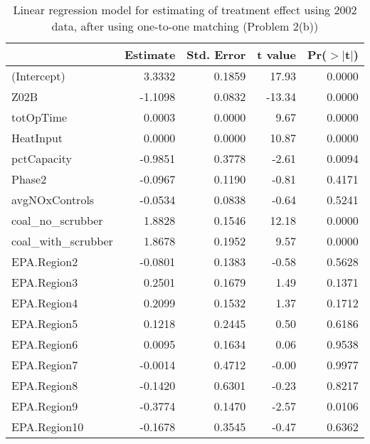 


\begin{table}[ht]
\centering
\begin{tabular}{lrrrr}
  \toprule
 & Estimate & Std. Error & t value & Pr($>$$|$t$|$) \\ 
  \midrule
(Intercept) & 3.3332 & 0.1859 & 17.93 & 0.0000 \\ 
  Z02B & -1.1098 & 0.0832 & -13.34 & 0.0000 \\ 
  totOpTime & 0.0003 & 0.0000 & 9.67 & 0.0000 \\ 
  HeatInput & 0.0000 & 0.0000 & 10.87 & 0.0000 \\ 
  pctCapacity & -0.9851 & 0.3778 & -2.61 & 0.0094 \\ 
  Phase2 & -0.0967 & 0.1190 & -0.81 & 0.4171 \\ 
  avgNOxControls & -0.0534 & 0.0838 & -0.64 & 0.5241 \\ 
  coal\_no\_scrubber & 1.8828 & 0.1546 & 12.18 & 0.0000 \\ 
  coal\_with\_scrubber & 1.8678 & 0.1952 & 9.57 & 0.0000 \\ 
  EPA.Region2 & -0.0801 & 0.1383 & -0.58 & 0.5628 \\ 
  EPA.Region3 & 0.2501 & 0.1679 & 1.49 & 0.1371 \\ 
  EPA.Region4 & 0.2099 & 0.1532 & 1.37 & 0.1712 \\ 
  EPA.Region5 & 0.1218 & 0.2445 & 0.50 & 0.6186 \\ 
  EPA.Region6 & 0.0095 & 0.1634 & 0.06 & 0.9538 \\ 
  EPA.Region7 & -0.0014 & 0.4712 & -0.00 & 0.9977 \\ 
  EPA.Region8 & -0.1420 & 0.6301 & -0.23 & 0.8217 \\ 
  EPA.Region9 & -0.3774 & 0.1470 & -2.57 & 0.0106 \\ 
  EPA.Region10 & -0.1678 & 0.3545 & -0.47 & 0.6362 \\ 
   \bottomrule
\end{tabular}
\caption{Linear regression model for estimating of treatment effect using 2002 data, after using one-to-one matching (Problem 2(b))} 
\label{tab:lm-2b-02}
\end{table}

